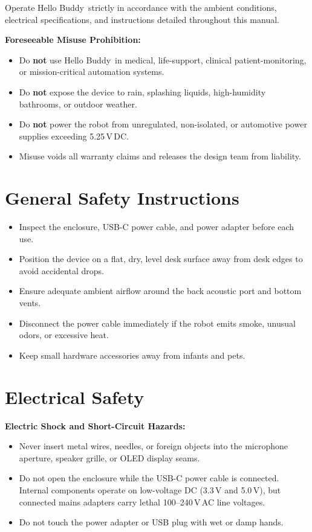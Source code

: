 \documentclass[11pt,a4paper,oneside]{report}
\newcommand{\ProductName}{Hello Buddy}
\begin{document}
Operate \ProductName\ strictly in accordance with the ambient conditions, electrical specifications, and instructions detailed throughout this manual.

\begin{warning}
\textbf{Foreseeable Misuse Prohibition:}
\begin{itemize}[leftmargin=*]
\item Do \textbf{not} use \ProductName\ in medical, life-support, clinical patient-monitoring, or mission-critical automation systems.
\item Do \textbf{not} expose the device to rain, splashing liquids, high-humidity bathrooms, or outdoor weather.
\item Do \textbf{not} power the robot from unregulated, non-isolated, or automotive power supplies exceeding 5.25\,V\,DC.
\item Misuse voids all warranty claims and releases the design team from liability.
\end{itemize}
\end{warning}

\section{General Safety Instructions}
\begin{itemize}[leftmargin=*]
\item Inspect the enclosure, USB-C power cable, and power adapter before each use.
\item Position the device on a flat, dry, level desk surface away from desk edges to avoid accidental drops.
\item Ensure adequate ambient airflow around the back acoustic port and bottom vents.
\item Disconnect the power cable immediately if the robot emits smoke, unusual odors, or excessive heat.
\item Keep small hardware accessories away from infants and pets.
\end{itemize}

\section{Electrical Safety}
\begin{danger}
\textbf{Electric Shock and Short-Circuit Hazards:}
\begin{itemize}[leftmargin=*]
\item Never insert metal wires, needles, or foreign objects into the microphone aperture, speaker grille, or OLED display seams.
\item Do not open the enclosure while the USB-C power cable is connected. Internal components operate on low-voltage DC (3.3\,V and 5.0\,V), but connected mains adapters carry lethal 100--240\,V\,AC line voltages.
\item Do not touch the power adapter or USB plug with wet or damp hands.
\end{itemize}
\end{danger}
\end{document}

